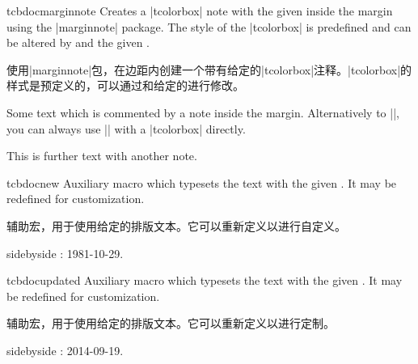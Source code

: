 \begin{docCommand}[doc new=2014-09-19]{tcbdocmarginnote}{}
Creates a |tcolorbox| note with the given  inside the margin using
the |marginnote| package. The style of the |tcolorbox| is predefined and can be
altered by  and the given .

使用|marginnote|包，在边距内创建一个带有给定的|tcolorbox|注释。|tcolorbox|的样式是预定义的，可以通过和给定的进行修改。
\begin{dispExample}
Some text
which is commented by a note inside the margin.
Alternatively to |\tcbdocmarginnote|, you can always use
|\marginnote| with a |tcolorbox| directly.\par
This is further text%
with another note.
\end{dispExample}
\end{docCommand}

\begin{docCommand}[doc new=2014-09-19]{tcbdocnew}{}
Auxiliary macro which typesets the  text with
the given . It may be redefined for customization.

辅助宏，用于使用给定的排版文本。它可以重新定义以进行自定义。 

\makeatletter\renewcommand*{\tcbdocnew}[1]{\kvtcb@text@new: #1}\makeatother%
\begin{dispExample*}{sidebyside}
\tcbdocnew{1981-10-29}.
\tcbdocmarginnote{\tcbdocnew{1978-02-09}}
\end{dispExample*}
\end{docCommand}

\begin{docCommand}[doc new=2014-09-19]{tcbdocupdated}{}
Auxiliary macro which typesets the  text with
the given . It may be redefined for customization.

辅助宏，用于使用给定的排版文本。它可以重新定义以进行定制。

\makeatletter\renewcommand*{\tcbdocupdated}[1]{\kvtcb@text@updated: #1}\makeatother%
\begin{dispExample*}{sidebyside}
\tcbdocupdated{2014-09-19}.
\end{dispExample*}
\end{docCommand}

